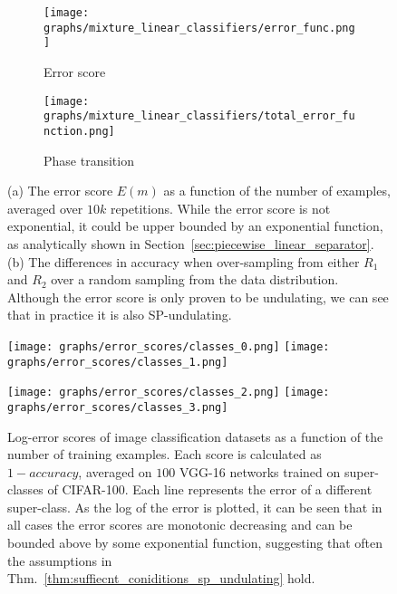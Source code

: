 \documentclass{article}
\newcommand{\pR}{1}\newcommand{\rR}{2}\newcommand{\prR}{i}
\begin{document}
\begin{figure}[thb!]
    \begin{subfigure}{.23\textwidth}
      \centering
        \texttt{[image: graphs/mixture\_linear\_classifiers/error\_func.png]}
        \caption{Error score}
\end{subfigure}
    \begin{subfigure}{.23\textwidth}
      \centering
        \texttt{[image: graphs/mixture\_linear\_classifiers/total\_error\_function.png]}
        \caption{Phase transition}
      \label{subfig:error_linear_classifier_mixture_b}
    \end{subfigure}
\caption{(a) The error score $E(m)$ as a function of the number of examples, averaged over $10k$ repetitions. While the error score is not exponential, it could be upper bounded by an exponential function, as analytically shown in Section~\ref{sec:piecewise_linear_separator}. (b) The differences in accuracy when over-sampling from either $R_\pR$ and $R_\rR$ over a random sampling from the data distribution. Although the error score is only proven to be undulating, we can see that in practice it is also SP-undulating.}
\label{fig:error_linear_classifier_mixture}
\end{figure}

\begin{figure}[thb!]
\texttt{[image: graphs/error\_scores/classes\_0.png]}
\texttt{[image: graphs/error\_scores/classes\_1.png]}

\texttt{[image: graphs/error\_scores/classes\_2.png]}
\texttt{[image: graphs/error\_scores/classes\_3.png]}
\caption{Log-error scores of image classification datasets as a function of the number of training examples. Each score is calculated as $1-accuracy$, averaged on $100$ VGG-16 networks trained on super-classes of CIFAR-100. Each line represents the error of a different super-class. As the log of the error is plotted, it can be seen that in all cases the error scores are monotonic decreasing and can be bounded above by some exponential function, suggesting that often the assumptions in Thm.~\ref{thm:suffiecnt_coniditions_sp_undulating}  hold.}
\label{fig:error_scores_neural_networks}
\end{figure}
\end{document}
